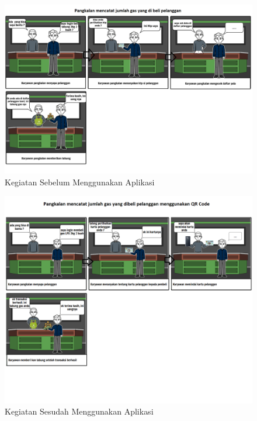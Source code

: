 	\vspace{-0.4cm}
	\begin{figure}[H]
		\center
		\includegraphics [width = 14cm]{gambar/storyboard/storyboard-1-(old)}
		\caption{Kegiatan Sebelum Menggunakan Aplikasi}
		\label{storyboardOld1}
	\end{figure}
	
	\begin{figure}[H]
		\center
		\includegraphics [width = 14cm]{gambar/storyboard/storyboard-1-(new)}
		\caption{Kegiatan Sesudah Menggunakan Aplikasi}
		\label{storyboardNew1}
	\end{figure}
	
	
	
